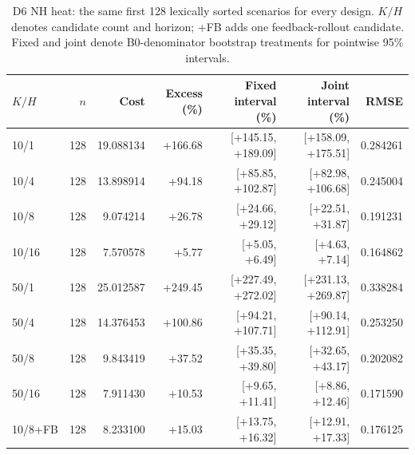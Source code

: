 \begin{table}[ht]
\centering\small
\caption{D6 NH heat: the same first 128 lexically sorted scenarios for every design. $K/H$ denotes candidate count and horizon; +FB adds one feedback-rollout candidate. Fixed and joint denote B0-denominator bootstrap treatments for pointwise 95\% intervals.}
\begin{tabular}{@{}lrrrrrr@{}}\toprule
$K/H$ & $n$ & Cost & Excess (\%) & Fixed interval (\%) & Joint interval (\%) & RMSE\\\midrule
10/1 & 128 & 19.088134 & +166.68 & [+145.15, +189.09] & [+158.09, +175.51] & 0.284261\\
10/4 & 128 & 13.898914 & +94.18 & [+85.85, +102.87] & [+82.98, +106.68] & 0.245004\\
10/8 & 128 & 9.074214 & +26.78 & [+24.66, +29.12] & [+22.51, +31.87] & 0.191231\\
10/16 & 128 & 7.570578 & +5.77 & [+5.05, +6.49] & [+4.63, +7.14] & 0.164862\\
50/1 & 128 & 25.012587 & +249.45 & [+227.49, +272.02] & [+231.13, +269.87] & 0.338284\\
50/4 & 128 & 14.376453 & +100.86 & [+94.21, +107.71] & [+90.14, +112.91] & 0.253250\\
50/8 & 128 & 9.843419 & +37.52 & [+35.35, +39.80] & [+32.65, +43.17] & 0.202082\\
50/16 & 128 & 7.911430 & +10.53 & [+9.65, +11.41] & [+8.86, +12.46] & 0.171590\\
10/8+FB & 128 & 8.233100 & +15.03 & [+13.75, +16.32] & [+12.91, +17.33] & 0.176125\\
\bottomrule\end{tabular}
\end{table}
